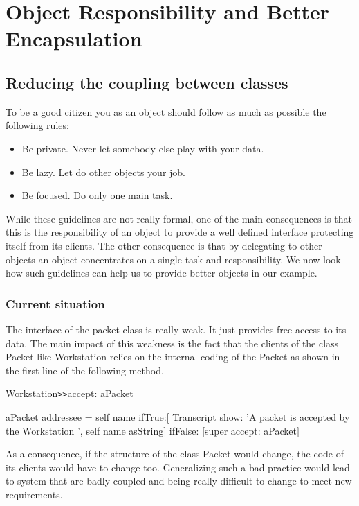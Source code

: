\chapter{ Object Responsibility and Better Encapsulation}

\section{Reducing the coupling between classes }


To be a good citizen you as an object should follow as much as 
possible the following rules:

\begin{itemize}
\item
Be private. Never let somebody else play with your data.
\item
Be lazy. Let do other objects your job.
\item
Be focused. Do only one main task. 
\end{itemize}

While these guidelines are not really formal, one of the main 
consequences is that this is the responsibility of an object 
to provide a well defined interface protecting itself from its 
clients. The other consequence is that by delegating to other 
objects an object concentrates on a single task and responsibility. 
We now look how such guidelines can help us to provide better 
objects in our example.



\subsection{Current situation}


The interface of the packet class is really weak. It just provides 
free access to its data. The main impact of this weakness is 
the fact that the clients of the class Packet like Workstation relies 
on the internal coding of the Packet as shown in the first line 
of the following method.

\begin{code}
 Workstation\texttt{>>}accept: aPacket

    aPacket addressee = self name
       ifTrue:\ensuremath{[} Transcript show: 'A packet is accepted by the 
Workstation ', self name asString\ensuremath{]}
       ifFalse: \ensuremath{[}super accept: aPacket\ensuremath{]}
\end{code}


As a consequence, if the structure of the class Packet would 
change, the code of its clients would have to change too. Generalizing 
such a bad practice would lead to system that are badly coupled 
and being really difficult to change to meet new requirements.



